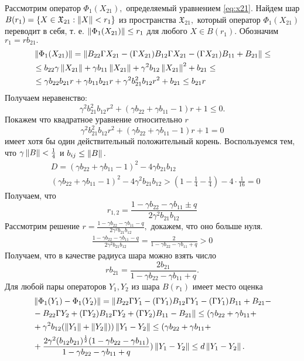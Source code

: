 Рассмотрим оператор $\Phi_1(X_{21}),$ определяемый уравнением \ref{eq:x21}. Найдем шар $B(r_1) = \{ X \in  \mathfrak{X}_{21}: \left\|X\right\| < r_1 \}$ из пространства $ \mathfrak{X}_{21},$ который оператор $\Phi_1(X_{21})$ переводит в себя, т.\! е. $\left\|\Phi_1(X_{21})\right\| \leq r_1$ для любого $X \in B(r_1).$ Обозначим $r_1 = rb_{21}.$
\begin{align*}
&\left\|\Phi_1(X_{21})\right\| = \left\|B_{22}\Gamma X_{21} - (\Gamma X_{21})B_{12}\Gamma X_{21} - (\Gamma X_{21})B_{11} + B_{21}\right\| \leq \\
&\leq b_{22}\gamma\left\|X_{21}\right\| + \gamma b_{11}\left\|X_{21}\right\| + \gamma^2 b_{12}\left\|X_{21}\right\|^2 + b_{21} \leq \\ 
&\leq \gamma b_{22}b_{21}r + \gamma b_{11}b_{21}r + \gamma^2 b_{21}^2 b_{12}r^2 + b_{21} \leq b_{21}r
\end{align*}
Получаем неравенство:
$$
\gamma^2 b_{21}^2 b_{12}r^2 + (\gamma b_{22} + \gamma b_{11} - 1)r + 1 \leq 0.
$$
Покажем что квадратное уравнение относительно $r$
$$
\gamma^2 b_{21}^2 b_{12}r^2 + (\gamma b_{22} + \gamma b_{11} - 1)r + 1 = 0
$$
имеет хотя бы один действительный положительный корень. Воспользуемся тем, что $\gamma\left\|B\right\| < \frac{1}{4}$ и $b_{ij} \leq \left\|B\right\|.$
\begin{align*}
&D = (\gamma b_{22} + \gamma b_{11} - 1)^2 - 4\gamma b_{21}b_{12} \\
&(\gamma b_{22} + \gamma b_{11} - 1)^2 - 4\gamma^2 b_{21}b_{12} > (1 - \frac{1}{4} - \frac{1}{4}) - 4\cdot\frac{1}{16} = 0
\end{align*}
Получаем, что 
$$
	r_{1,2} = \frac{1 - \gamma b_{22} - \gamma b_{11} \pm q}{2\gamma^2 b_{21}b_{12}}
$$
Рассмотрим решение $r = \frac{1 - \gamma b_{22} - \gamma b_{11} - q}{2\gamma^2 b_{21}b_{12}},$ докажем, что оно больше нуля.
\begin{align*}
\frac{1 - \gamma b_{22} - \gamma b_{11} - q}{2\gamma^2 b_{21}b_{12}} = \frac{2}{1 - \gamma b_{22} - \gamma b_{11} + q} > 0
\end{align*}
Получаем, что в качестве радиуса шара можно взять число
$$
 rb_{21} = \frac{2b_{21}}{1 - \gamma b_{22} - \gamma b_{11} + q}.
$$
Для любой пары операторов $Y_1, Y_2$ из шара $B(r_1)$ имеет место оценка
\begin{align*}
&\left\|\Phi_1(Y_1) - \Phi_1(Y_2)\right\| = \|B_{22}\Gamma Y_1 - (\Gamma Y_1)B_{12}\Gamma Y_1 - (\Gamma Y_1)B_{11} + B_{21} - \\
& - B_{22}\Gamma Y_2 + (\Gamma Y_2)B_{12}\Gamma Y_2 + (\Gamma Y_2)B_{11} - B_{21}\| \leq (\gamma b_{22} + \gamma b_{11} + \\
& + \gamma^2 b_{12}(\left\|Y_1\right\| + \left\|Y_2\right\|))\left\|Y_1 - Y_2\right\| \leq (\gamma b_{22} + \gamma b_{11} + \\ & + \frac{2\gamma^2 (b_{12}b_{21})^{\frac{1}{2}}(1 - \gamma b_{22} - \gamma b_{11})}{1 - \gamma b_{22} - \gamma b_{11} + q})\left\|Y_1 - Y_2\right\| \leq d\left\|Y_1 - Y_2\right\|.
\end{align*}
